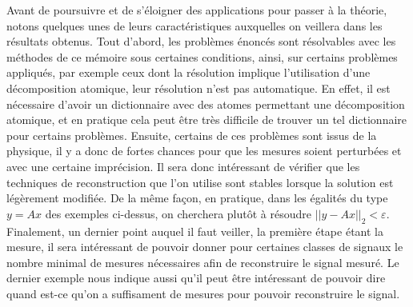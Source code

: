 Avant de poursuivre et de s'éloigner des applications pour passer à la théorie, notons quelques unes de leurs caractéristiques auxquelles on veillera dans les résultats obtenus.
\newline
Tout d'abord, les problèmes énoncés sont résolvables avec les méthodes de ce mémoire sous certaines conditions, ainsi, sur certains problèmes appliqués, par exemple ceux dont la résolution implique l'utilisation d'une décomposition atomique, leur résolution n'est pas automatique.
En effet, il est nécessaire d'avoir un dictionnaire avec des atomes permettant une décomposition atomique, et en pratique cela peut être très difficile de trouver un tel dictionnaire pour certains problèmes.
\newline
Ensuite, certains de ces problèmes sont issus de la physique, il y a donc de fortes chances pour que les mesures soient perturbées et avec une certaine imprécision. 
Il sera donc intéressant de vérifier que les techniques de reconstruction que l'on utilise sont stables lorsque la solution est légèrement modifiée.
De la même façon, en pratique, dans les égalités du type $y=Ax$ des exemples ci-dessus, on cherchera plutôt à résoudre $||y-Ax||_2 < \varepsilon$.
\newline
Finalement, un dernier point auquel il faut veiller, la première étape étant la mesure, il sera intéressant de pouvoir donner pour certaines classes de signaux le nombre minimal de mesures nécessaires afin de reconstruire le signal mesuré.
Le dernier exemple nous indique aussi qu'il peut être intéressant de pouvoir dire quand est-ce qu'on a suffisament de mesures pour pouvoir reconstruire le signal.

